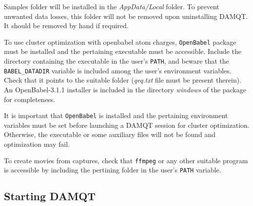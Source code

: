 \documentclass[10pt]{article}
\begin{document}
Samples folder will be installed in the {\it AppData/Local} folder.
To prevent unwanted data losses, this folder will not be removed upon uninstalling 
DAMQT. It should be removed by hand if required.

To use cluster optimization with openbabel atom charges, \texttt{OpenBabel} package must be installed
and the pertaining executable must be accessible. Include the directory containing the executable
in the user's \texttt{PATH}, and beware that the \texttt{BABEL\_DATADIR} variable is included
among the user's environment variables. Check that it points to the suitable folder ({\it qeq.txt} file 
must be present therein). An OpenBabel-3.1.1 installer is included in the directory 
{\it windows} of the package for completeness. 

It is important that \texttt{OpenBabel} is installed and the pertaining environment variables must be set before
launching a DAMQT session for cluster optimization. Otherwise, the executable or some auxiliary files
will not be found and optimization may fail.

To create movies from captures, check that \texttt{ffmpeg} or any other suitable program is accessible by
including the pertining folder in the user's \texttt{PATH} variable. 

\subsection{Starting DAMQT \label{sec:1.3}}
\end{document}
